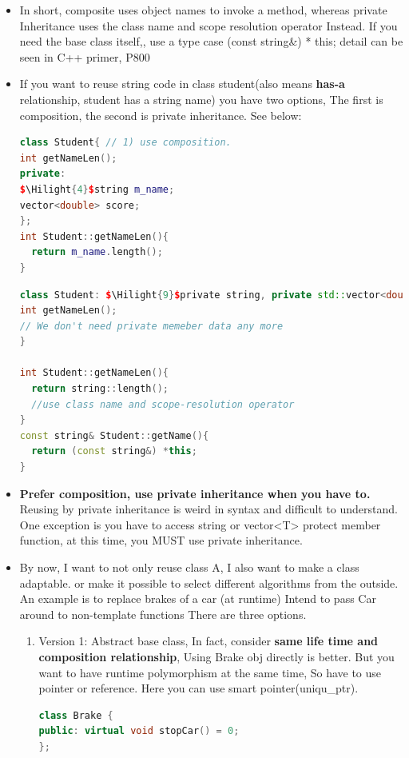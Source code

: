 \documentclass[a4paper,12pt,twoside]{book}
\newcommand{\Hilight}[1]{\makebox[0pt][l]{\color{yellow}\rule[-3pt]{#1em}{11pt}}}
\begin{document}
\begin{itemize}
\item In short, composite uses object names to invoke a method, whereas private Inheritance uses the class name and scope resolution operator Instead. If you need the base class itself,, use a type case (const string\&) * this; detail can be seen in C++ primer, P800

\item If you want to reuse string code in class student(also means \textbf{has-a} relationship, student has a string name) you have two options, The first is composition,  the second is private inheritance. See below:
\begin{lstlisting}[frame=single, language=c++, mathescape=true]
class Student{ // 1) use composition.
int getNameLen();
private:
$\Hilight{4}$string m_name;
vector<double> score;
};
int Student::getNameLen(){
  return m_name.length();
}
\end{lstlisting}

\begin{lstlisting}[frame=single, language=c++, mathescape=true]
class Student: $\Hilight{9}$private string, private std::vector<double>{
int getNameLen();
// We don't need private memeber data any more
}

int Student::getNameLen(){
  return string::length();
  //use class name and scope-resolution operator
}
const string& Student::getName(){
  return (const string&) *this;
}
\end{lstlisting}

\item \textbf{Prefer composition, use private inheritance when you have to.} Reusing by private inheritance is weird in syntax and difficult to understand. One exception is you have to access string or vector<T> protect member function, at this time, you MUST use private inheritance.

\item By now, I want to not only reuse class A, I also want to make a class adaptable. or make it possible to select different algorithms from the outside.  An example is  to replace brakes of a car (at runtime) Intend to pass Car around to non-template functions There are three options.
\begin{enumerate}
\item Version 1: Abstract base class, In fact, consider \textbf{same life time and composition relationship},  Using Brake obj directly is better. But you want to have runtime polymorphism at the same time, So have to use pointer or reference. Here you can use smart pointer(uniqu\_ptr).
\begin{lstlisting}[frame=single, language=c++]
class Brake {
public: virtual void stopCar() = 0;
};


\end{lstlisting}
\end{enumerate}
\end{itemize}
\end{document}
